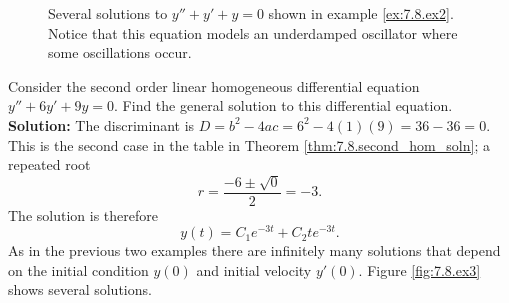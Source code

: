 \begin{figure}[ht!]
    \begin{center}
    \end{center}
    \caption{Several solutions to $y''+y'+y=0$ shown in example \ref{ex:7.8.ex2}. Notice
that this equation models an underdamped oscillator where some oscillations occur.}
    \label{fig:7.8.ex2}
\end{figure}



\begin{example}\label{ex:7.8.ex3}
Consider the second order linear homogeneous differential equation $y''+6y'+9y=0$. Find
the general solution to this differential equation.
\\{\bf Solution:}
The discriminant is $D=b^2-4ac = 6^2-4(1)(9)=36-36=0$.  This is the second case in the
table in Theorem \ref{thm:7.8.second_hom_soln}; a repeated root
\[ r = \frac{-6 \pm \sqrt{0}}{2} = -3. \]
The solution is therefore
\[ y(t) = C_1 e^{-3t} + C_2 t e^{-3t}. \]
As in the previous two examples there are infinitely many solutions that depend on the
initial condition $y(0)$ and initial velocity $y'(0)$. Figure \ref{fig:7.8.ex3} shows
several solutions.
\end{example}

